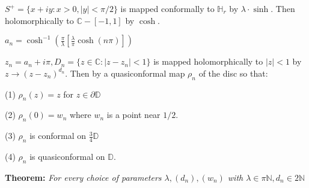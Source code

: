 \documentclass{beamer}
\begin{document}
\begin{frame} 

{\tiny $S^+ = \{ x + iy : x > 0, |y| < \pi/2 \}$ is mapped conformally to $\mathbb{H}_r$ by $\lambda\cdot\sinh$. Then holomorphically to $\mathbb{C} - [-1,1]$ by $\cosh$.

\vspace{2.5mm}

$a_n = \cosh^{-1}\left( \frac{\pi}{\lambda} \left[ \frac{\lambda}{\pi} \cosh(n\pi) \right] \right)$

\vspace{2.5mm}

$z_n = a_n + i\pi, D_n = \{ z \in \mathbb{C} : \left| z - z_n \right| < 1\} $ is mapped holomorphically to $|z|<1$ by $z\rightarrow (z - z_n)^{d_n}$. Then by a quasiconformal map $\rho_n$ of the disc so that: 

\hspace{5mm} (1) $\rho_n(z)=z$ for $z\in\partial\mathbb{D}$

\hspace{5mm} (2) $\rho_n(0)=w_n$ where $w_n$ is a point near $1/2$.

\hspace{5mm} (3) $\rho_n$ is conformal on $\frac{3}{4}\mathbb{D}$

\hspace{5mm} (4) $\rho_n$ is quasiconformal on $\mathbb{D}$.  

}

\vspace{5mm}

{\bf Theorem:}  {\it For every choice of parameters $\lambda, (d_n), (w_n)$ with $\lambda \in \pi\mathbb{N}, d_n \in 2\mathbb{N}$}


\end{frame}
\end{document}
